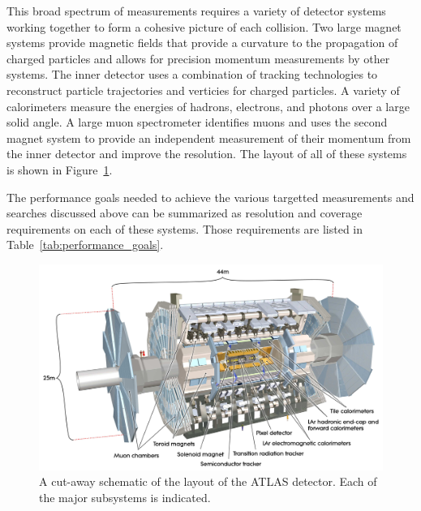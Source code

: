 This broad spectrum of measurements requires a variety of detector systems working together to form a cohesive picture of each collision. 
Two large magnet systems provide magnetic fields that provide a curvature to the propagation of charged particles and allows for precision momentum measurements by other systems.
The inner detector uses a combination of tracking technologies to reconstruct particle trajectories and verticies for charged particles.
A variety of calorimeters measure the energies of hadrons, electrons, and photons over a large solid angle.
A large muon spectrometer identifies muons and uses the second magnet system to provide an independent measurement of their momentum from the inner detector and improve the resolution. 
The layout of all of these systems is shown in Figure~\ref{fig:atlas_overview}.


The performance goals needed to achieve the various targetted measurements and searches discussed above can be summarized as resolution and coverage requirements on each of these systems.
Those requirements are listed in Table~\ref{tab:performance_goals}.

\begin{figure}[hbtp]
\includegraphics[width=\fullfig]{figures/atlas_overview.pdf}
\caption{A cut-away schematic of the layout of the \ac{ATLAS} detector. Each of the major subsystems is indicated.}
\label{fig:atlas_overview}
\end{figure}

